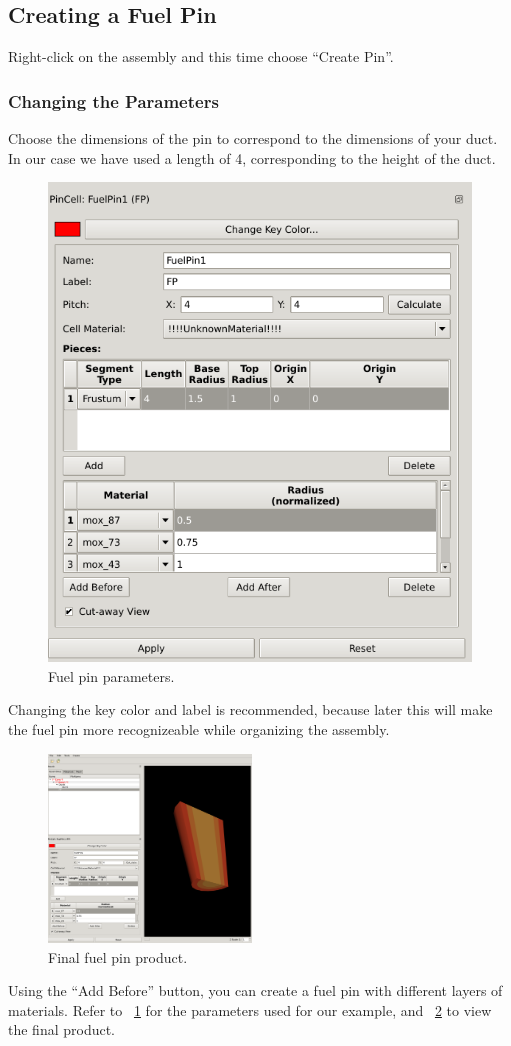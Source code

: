 \clearpage

\subsection{Creating a Fuel Pin}

Right-click on the assembly and this time choose ``Create Pin''.

\subsubsection{Changing the Parameters}

Choose the dimensions of the pin to correspond to the dimensions of your duct.  In our case we have used a length of 4, corresponding to the height of the duct.

\begin{figure}[htb]
\begin{center}
\includegraphics[width=0.4\linewidth]{Images/rect-5.png}
\caption{Fuel pin parameters.}
\label{fig:Rect5}
\end{center}
\end{figure}

Changing the key color and label is recommended, because later this will make the fuel pin more recognizeable while organizing the assembly.

\begin{figure}
  \begin{center}
    \includegraphics[width=0.48\textwidth]{Images/rect-6}
  \end{center}
  \caption{Final fuel pin product.}
  \label{fig:Rect6}
\end{figure}
Using the ``Add Before'' button, you can create a fuel pin with different layers of materials.  Refer to ~\ref{fig:Rect5} for the parameters used for our example, and ~\ref{fig:Rect6} to view the final product.

